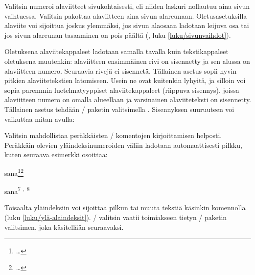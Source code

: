 \begin{koodilohkosis}
\usepackage[norule]{footmisc}
\end{koodilohkosis}

\noindent
Valitsin  numeroi alaviitteet sivukohtaisesti, eli niiden
laskuri nollautuu aina sivun vaihtuessa. Valitsin 
pakottaa alaviitteen aina sivun alareunaan. Oletusasetuksilla alaviite
voi sijoittua joskus ylemmäksi, jos sivun alaosaan ladotaan leijuva osa
tai jos sivun alareunan tasaaminen on pois päältä
(, luku \ref{luku/sivunvaihdot}).

Oletuksena alaviitekappaleet ladotaan samalla tavalla kuin
tekstikappaleet oletuksena muutenkin: alaviitteen ensimmäinen rivi on
sisennetty ja sen alussa on alaviitteen numero. Seuraavia rivejä ei
sisennetä. Tällainen asetus sopii hyvin pitkien alaviitetekstien
latomiseen. Usein ne ovat kuitenkin lyhyitä, ja silloin voi sopia
paremmin luetelmatyyppiset alaviitekappaleet (riippuva sisennys), joissa
alaviitteen numero on omalla alueellaan ja varsinainen alaviiteteksti on
sisennetty. Tällainen asetus tehdään \-/ paketin
valitsimella . Sisennyksen suuruuteen voi vaikuttaa mitan
 avulla:

\begin{koodilohkosis}
\usepackage[hang]{footmisc}
\setlength{\footnotemargin}{1.5em}
\end{koodilohkosis}

\noindent
Valitsin  mahdollistaa peräkkäisten
\-/ komentojen kirjoittamisen helposti. Peräkkäin
olevien yläindeksinumeroiden väliin ladotaan automaattisesti pilkku,
kuten seuraava esimerkki osoittaa:

\begin{koodilohkosis}
sana\footnote{…}\footnote{…}
\end{koodilohkosis}

\begin{tulossis}
  sana\textsuperscript{7}%
  \textsuperscript*{,}%
  \textsuperscript{8}
\end{tulossis}

\noindent
Toisaalta yläindeksiin voi sijoittaa pilkun tai muuta tekstiä käsinkin
komennolla  (luku \ref{luku/ylä-alaindeksit}).
\-/ valitsin vaatii toimiakseen tietyn
\-/ paketin valitsimen, joka käsitellään seuraavaksi.


